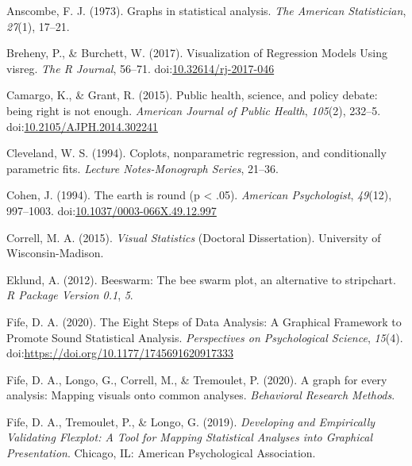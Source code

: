 \documentclass[
  man]{apa6}
\newlength{\cslhangindent}
\newenvironment{cslreferences}%
  {\setlength{\parindent}{0pt}%
  \everypar{\setlength{\hangindent}{\cslhangindent}}\ignorespaces}%
  {\par}
\begin{document}
\begin{cslreferences}
\leavevmode\hypertarget{ref-anscombe1973graphs}{}%
Anscombe, F. J. (1973). Graphs in statistical analysis. \emph{The American Statistician}, \emph{27}(1), 17--21.

\leavevmode\hypertarget{ref-Breheny}{}%
Breheny, P., \& Burchett, W. (2017). Visualization of Regression Models Using visreg. \emph{The R Journal}, 56--71. doi:\href{https://doi.org/10.32614/rj-2017-046}{10.32614/rj-2017-046}

\leavevmode\hypertarget{ref-Camargo2015}{}%
Camargo, K., \& Grant, R. (2015). Public health, science, and policy debate: being right is not enough. \emph{American Journal of Public Health}, \emph{105}(2), 232--5. doi:\href{https://doi.org/10.2105/AJPH.2014.302241}{10.2105/AJPH.2014.302241}

\leavevmode\hypertarget{ref-Cleveland1994}{}%
Cleveland, W. S. (1994). Coplots, nonparametric regression, and conditionally parametric fits. \emph{Lecture Notes-Monograph Series}, 21--36.

\leavevmode\hypertarget{ref-cohen_earth_1994}{}%
Cohen, J. (1994). The earth is round (p \textless{} .05). \emph{American Psychologist}, \emph{49}(12), 997--1003. doi:\href{https://doi.org/10.1037/0003-066X.49.12.997}{10.1037/0003-066X.49.12.997}

\leavevmode\hypertarget{ref-Correll2015}{}%
Correll, M. A. (2015). \emph{Visual Statistics} (Doctoral Dissertation). University of Wisconsin-Madison.

\leavevmode\hypertarget{ref-eklund2012beeswarm}{}%
Eklund, A. (2012). Beeswarm: The bee swarm plot, an alternative to stripchart. \emph{R Package Version 0.1}, \emph{5}.

\leavevmode\hypertarget{ref-Fife2019e}{}%
Fife, D. A. (2020). The Eight Steps of Data Analysis: A Graphical Framework to Promote Sound Statistical Analysis. \emph{Perspectives on Psychological Science}, \emph{15}(4). doi:\href{https://doi.org/https://doi.org/10.1177/1745691620917333}{https://doi.org/10.1177/1745691620917333}

\leavevmode\hypertarget{ref-fife2020bb}{}%
Fife, D. A., Longo, G., Correll, M., \& Tremoulet, P. (2020). A graph for every analysis: Mapping visuals onto common analyses. \emph{Behavioral Research Methods}.

\leavevmode\hypertarget{ref-Fife2019d}{}%
Fife, D. A., Tremoulet, P., \& Longo, G. (2019). \emph{Developing and Empirically Validating Flexplot: A Tool for Mapping Statistical Analyses into Graphical Presentation}. Chicago, IL: American Psychological Association.


\end{cslreferences}
\end{document}
